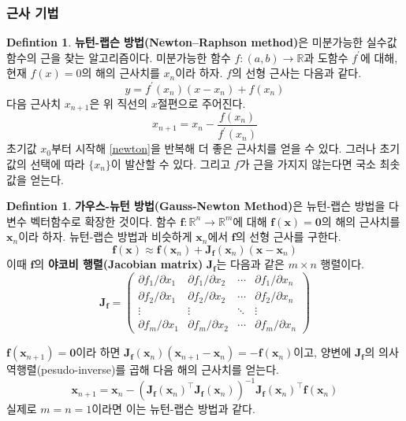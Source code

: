 \documentclass{gshs_thesis}
\theoremstyle{theorem}
\theoremstyle{lemma}
\theoremstyle{definition}
\newtheorem{definition}[theorem]{Defintion}
\begin{document}
\subsubsection{근사 기법}
\begin{definition}
\textbf{뉴턴-랩슨 방법(Newton–Raphson method)}은 미분가능한 실수값 함수의 근을 찾는 알고리즘이다. 미분가능한 함수 $f\colon(a, b)\to\mathbb{R}$과 도함수 $f^\prime$에 대해, 현재 $f(x)=0$의 해의 근사치를 $x_n$이라 하자.  $f$의 선형 근사는 다음과 같다.
\begin{equation*}
	y=f^\prime(x_n)(x-x_n)+f(x_n)
\end{equation*}
다음 근사치 $x_{n+1}$은 위 직선의 $x$절편으로 주어진다.
\begin{equation} \label{newton}
	x_{n+1}=x_n-\frac{f(x_{n})}{f^\prime(x_n)}
\end{equation}
초기값 $x_0$부터 시작해 \cref{newton}을 반복해 더 좋은 근사치를 얻을 수 있다. 그러나 초기값의 선택에 따라 $\{x_n\}$이 발산할 수 있다. 그리고 $f$가 근을 가지지 않는다면 국소 최솟값을 얻는다.
\end{definition}
\begin{definition}
\textbf{가우스-뉴턴 방법(Gauss-Newton Method)}은 뉴턴-랩슨 방법을 다변수 벡터함수로 확장한 것이다. 함수 $\mathbf{f} \colon \mathbb{R}^n \to \mathbb{R}^m$에 대해 $\mathbf{f}(\mathbf{x}) = \mathbf{0}$의 해의 근사치를 $\mathbf{x}_n$이라 하자. 뉴턴-랩슨 방법과 비슷하게 $\mathbf{x}_n$에서 $\mathbf{f}$의 선형 근사를 구한다. 
$$ \mathbf{f}(\mathbf{x}) \approx \mathbf{f}(\mathbf{x}_n) + \mathbf{J}_{\mathbf{f}}(\mathbf{x}_n) (\mathbf{x} - \mathbf{x}_n) $$
이때 $\mathbf{f}$의 \textbf{야코비 행렬(Jacobian matrix)} $\mathbf{J}_{\mathbf{f}}$는 다음과 같은 $m \times n$ 행렬이다. 
$$ \mathbf{J}_{\mathbf{f}}= \begin{pmatrix} \partial f_1 / \partial x_1 & \partial f_1 / \partial x_2 & \cdots & \partial f_1 / \partial x_n \\ \partial f_2 / \partial x_1 & \partial f_2 / \partial x_2 & \cdots & \partial f_2 / \partial x_n \\ \vdots & \vdots & \ddots & \vdots \\ \partial f_m / \partial x_1 & \partial f_m / \partial x_2 & \cdots & \partial f_m / \partial x_n \end{pmatrix}$$

$\mathbf{f}(\mathbf{x}_{n+1}) = \mathbf{0}$이라 하면 $\mathbf{J}_{\mathbf{f}}(\mathbf{x}_n) (\mathbf{x}_{n+1} - \mathbf{x}_n) = -\mathbf{f}(\mathbf{x}_n)$이고, 양변에 $\mathbf{J}_\mathbf{f}$의 의사역행렬(pesudo-inverse)를 곱해 다음 해의 근사치를 얻는다. 
$$ \mathbf{x}_{n+1} = \mathbf{x}_n - (\mathbf{J}_{\mathbf{f}}(\mathbf{x}_n)^\intercal \mathbf{J}_{\mathbf{f}}(\mathbf{x}_n))^{-1} \mathbf{J}_{\mathbf{f}}(\mathbf{x}_n)^\intercal \mathbf{f}(\mathbf{x}_n) $$
실제로 $m = n = 1$이라면 이는 뉴턴-랩슨 방법과 같다.
\end{definition}
\end{document}
